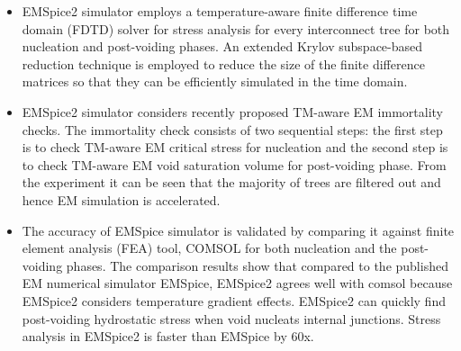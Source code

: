 \begin{itemize}
\item EMSpice2 simulator employs a temperature-aware finite difference time
domain (FDTD) solver for stress analysis for every
interconnect tree for both nucleation and post-voiding
phases. An extended Krylov subspace-based
  reduction technique is employed to reduce the size of the
  finite difference matrices so that they can be efficiently simulated
  in the time domain.
  
 \item EMSpice2 simulator considers recently proposed TM-aware EM immortality checks. 
 The immortality check consists of two sequential steps: the first step is to check 
 TM-aware EM critical stress for nucleation and the second step is to check TM-aware EM void saturation volume for post-voiding phase.
 From the experiment it can be seen that
the majority of trees are filtered out and hence EM
simulation is accelerated.
 
 
\item The accuracy of EMSpice simulator is validated by comparing
it against finite element analysis
(FEA) tool, COMSOL for both nucleation and the post-voiding phases.
The comparison results show that compared to the published EM numerical simulator EMSpice,
EMSpice2 agrees well with comsol because EMSpice2 considers temperature gradient effects. EMSpice2
 can quickly find post-voiding hydrostatic stress when void nucleats internal junctions.
 Stress analysis in EMSpice2 is faster than EMSpice by 60x. 

  
\end{itemize}
